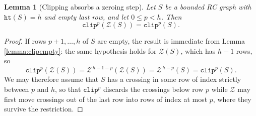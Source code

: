 \documentclass{amsart}
\newtheorem{lemma}{Lemma}[subsection]
\theoremstyle{definition}
\theoremstyle{remark}
\numberwithin{equation}{subsection}
\newcommand{\zeromap}{\mathcal{Z}}
\newcommand{\hr}{\mathtt{ht}}
\newcommand{\clp}{\mathtt{clip}}
\begin{document}
\begin{lemma}[Clipping absorbs a zeroing step]\label{lemma:clipzero}
Let $S$ be a bounded RC graph with $\hr(S)=h$ and empty last row, and let $0\leq p<h$. Then
$$\clp^p(\zeromap(S))=\clp^p(S).$$
\end{lemma}
\begin{proof}
If rows $p+1,\ldots,h$ of $S$ are empty, the result is immediate from Lemma \ref{lemma:clipempty}: the same hypothesis holds for $\zeromap(S)$, which has $h-1$ rows, so
$$\clp^p(\zeromap(S))=\zeromap^{\,h-1-p}(\zeromap(S))=\zeromap^{\,h-p}(S)=\clp^p(S).$$
We may therefore assume that $S$ has a crossing in some row of index strictly between $p$ and $h$, so that $\clp^p$ discards the crossings below row $p$ while $\zeromap$ may first move crossings out of the last row into rows of index at most $p$, where they survive the restriction.


\end{proof}
\end{document}
